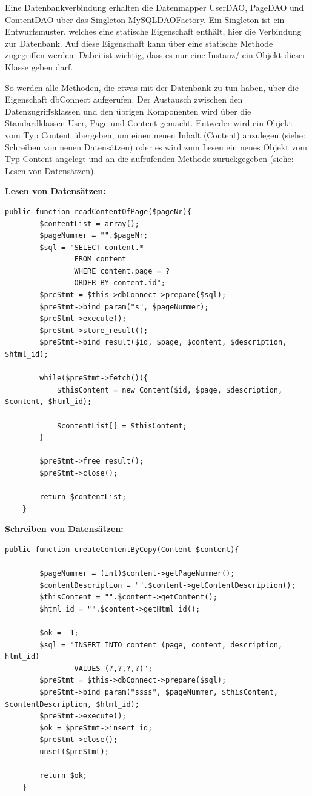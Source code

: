 \documentclass[10.5pt]{scrarticle}
\begin{document}
Eine Datenbankverbindung erhalten die Datenmapper UserDAO, PageDAO und ContentDAO über das Singleton MySQLDAOFactory. Ein Singleton ist ein Entwurfsmuster, welches eine statische Eigenschaft enthält,  hier die Verbindung zur Datenbank. Auf diese Eigenschaft kann über eine statische Methode zugegriffen werden. Dabei ist wichtig, dass es nur eine Instanz/ ein Objekt dieser Klasse geben darf.

So werden alle Methoden, die etwas mit der Datenbank zu tun haben, über die Eigenschaft dbConnect aufgerufen. Der Austausch zwischen den Datenzugriffsklassen und den übrigen Komponenten wird über die Standardklassen User, Page und Content gemacht. Entweder wird ein Objekt vom Typ Content übergeben, um einen neuen Inhalt (Content) anzulegen (siehe: Schreiben von neuen Datensätzen) oder es wird zum Lesen ein neues Objekt vom Typ Content angelegt und an die aufrufenden Methode zurückgegeben (siehe: Lesen von Datensätzen).

\textbf{Lesen von Datensätzen:}

\lstset{firstnumber=16}
\begin{lstlisting}
public function readContentOfPage($pageNr){
        $contentList = array();
        $pageNummer = "".$pageNr;
        $sql = "SELECT content.*
                FROM content
                WHERE content.page = ?
                ORDER BY content.id";
        $preStmt = $this->dbConnect->prepare($sql);
        $preStmt->bind_param("s", $pageNummer);
        $preStmt->execute();
		$preStmt->store_result();
        $preStmt->bind_result($id, $page, $content, $description, $html_id);
        
        while($preStmt->fetch()){
			$thisContent = new Content($id, $page, $description, $content, $html_id);

			$contentList[] = $thisContent;
        }
        
        $preStmt->free_result();
        $preStmt->close();
        
        return $contentList;
    }
\end{lstlisting}

\textbf{Schreiben von Datensätzen:}

\lstset{firstnumber=103}
\begin{lstlisting}
public function createContentByCopy(Content $content){

        $pageNummer = (int)$content->getPageNummer();
        $contentDescription = "".$content->getContentDescription();
        $thisContent = "".$content->getContent();
        $html_id = "".$content->getHtml_id();

        $ok = -1;
        $sql = "INSERT INTO content (page, content, description, html_id)
                VALUES (?,?,?,?)";
        $preStmt = $this->dbConnect->prepare($sql);
        $preStmt->bind_param("ssss", $pageNummer, $thisContent, $contentDescription, $html_id);
        $preStmt->execute();
        $ok = $preStmt->insert_id;
        $preStmt->close();
        unset($preStmt);

        return $ok;
    }
\end{lstlisting}
\end{document}
